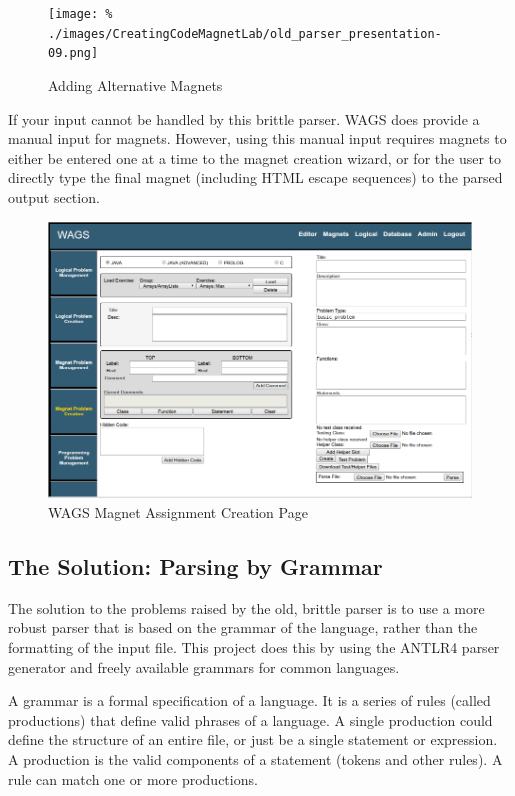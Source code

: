 \documentclass[letter,10pt]{article}
\begin{document}
\begin{figure}
 \centering
 
 \texttt{[image: \%
./images/CreatingCodeMagnetLab/old\_parser\_presentation-09.png]}
 \caption{Adding Alternative Magnets}
 \label{fig:old_parser_alts}
\end{figure}

If your input cannot be handled by this brittle parser. WAGS does 
provide a manual input for magnets. However, using this manual input 
requires magnets to either be entered one at a time to the magnet 
creation wizard, or for the user to directly type the final magnet 
(including HTML escape sequences) to the parsed output section. 

\begin{figure}
 \centering
 \includegraphics{./images/wags-magnet-creation.png}
 \caption{WAGS Magnet Assignment Creation Page}
 \label{fig:wags-magnet-creation}
\end{figure}


\subsection{The Solution: Parsing by Grammar}

The solution to the problems raised by the old, brittle parser is to 
use a more robust parser that is based on the grammar of the language, 
rather than the formatting of the input file. This project does this by 
using the ANTLR4 parser generator\cite{antlr-reference} and freely 
available grammars for common languages\cite{antlr-grammars-project}.

A grammar is a formal specification of a language. It is a series of 
rules (called productions) that define valid phrases of a language. A 
single production could define the structure of an entire file, or just 
be a single statement or expression. A production is the valid 
components of a statement (tokens and other rules). A rule can match 
one or more productions.
\end{document}
